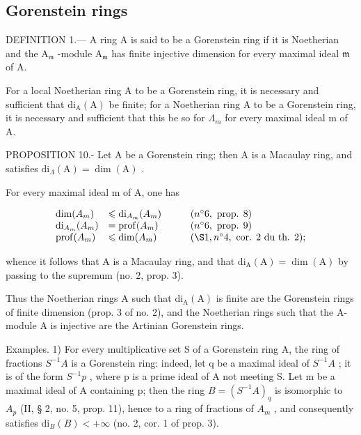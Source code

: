 \subsection{Gorenstein rings}

DEFINITION 1.--- A ring A is said to be a Gorenstein ring if it is Noetherian and the \(\mathrm{A}_{\mathfrak{m}}\) -module \(\mathrm{A}_{\mathfrak{m}}\) has finite injective dimension for every maximal ideal \(\mathfrak{m}\) of A.

For a local Noetherian ring A to be a Gorenstein ring, it is necessary and sufficient that \(\mathrm{di}_{\mathrm{A}}(\mathrm{A})\) be finite; for a Noetherian ring A to be a Gorenstein ring, it is necessary and sufficient that this be so for \(\Lambda_{m}\) for every maximal ideal m of A.

PROPOSITION 10.- Let A be a Gorenstein ring; then A is a Macaulay ring, and satisfies \(\mathrm{di}_{\Lambda}(\mathrm{A}) = \dim(\mathrm{A})\) .

For every maximal ideal m of A, one has

\[
\begin{array}{l l} \dim (A _ {m}) & \leqslant \mathrm{di} _ {A _ {m}} (A _ {m}) \\ \mathrm{di} _ {A _ {m}} (A _ {m}) & = \operatorname{prof} (A _ {m}) \\ \operatorname{prof} (A _ {m}) & \leqslant \dim (A _ {m}) \end{array} \quad \begin{array}{l l} & (n ^ {\circ} 6, \text { prop. } 8) \\ & (n ^ {\circ} 6, \text { prop. } 9) \\ & (\S 1, n ^ {\circ} 4, \text { cor. } 2 \text { du   th. } 2); \end{array}
\]

whence it follows that A is a Macaulay ring, and that \(\mathrm{di}_{\mathrm{A}}(\mathrm{A}) = \dim(\mathrm{A})\) by passing to the supremum (no. 2, prop. 3).

Thus the Noetherian rings A such that \(\mathrm{di}_{\mathrm{A}}(\mathrm{A})\) is finite are the Gorenstein rings of finite dimension (prop. 3 of no. 2), and the Noetherian rings such that the A-module A is injective are the Artinian Gorenstein rings.

Examples. 1) For every multiplicative set S of a Gorenstein ring A, the ring of fractions \(S^{-1}A\) is a Gorenstein ring: indeed, let q be a maximal ideal of \(S^{-1}A\) ; it is of the form \(S^{-1}p\) , where p is a prime ideal of A not meeting S. Let m be a maximal ideal of A containing p; then the ring \(B = (S^{-1}A)_q\) is isomorphic to \(A_p\) (II, § 2, no. 5, prop. 11), hence to a ring of fractions of \(A_m\) , and consequently satisfies \(\text{di}_B(B) < +\infty\) (no. 2, cor. 1 of prop. 3).

